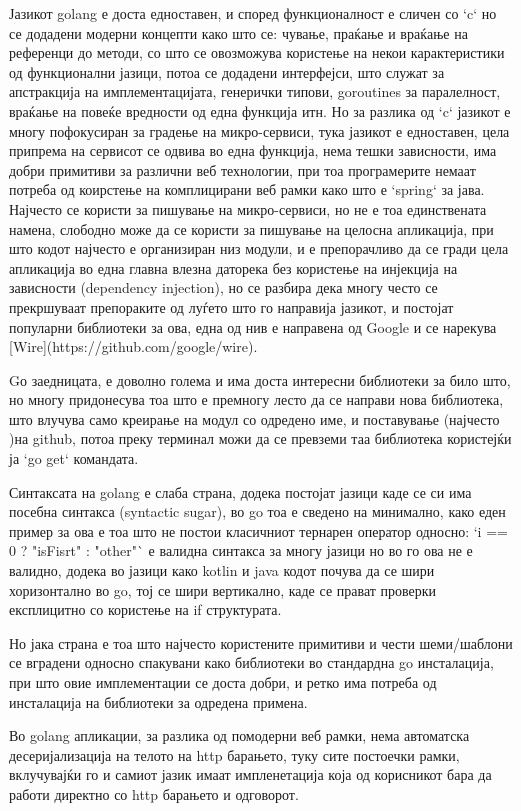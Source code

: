 \documentclass{article}
\begin{document}
Јазикот golang е доста едноставен, и според функционалност е сличен со `c` но се додадени модерни концепти како што се: чување, праќање и враќање на референци до методи, со што се овозможува користење на некои карактеристики од функционални јазици, потоа се додадени интерфејси, што служат за апстракција на имплементацијата, генерички типови, goroutines за паралелност, враќање на повеќе вредности од една функција итн. Но за разлика од `c`  јазикот е многу пофокусиран за градење на микро-сервиси, тука јазикот е едноставен, цела припрема на сервисот се одвива во една функција, нема тешки зависности, има добри примитиви за различни веб технологии, при тоа програмерите немаат потреба од коирстење на комплицирани веб рамки како што е `spring` за јава. Најчесто се користи за пишување на микро-сервиси, но не е тоа единствената намена, слободно може да се користи за пишување на целосна апликација, при што кодот најчесто е организиран низ модули, и е препорачливо да се гради цела апликација во една главна влезна даторека без користење на инјекција на зависности (dependency injection), но се разбира дека многу често се прекршуваат препораките од луѓето што го направија јазикот, и постојат популарни библиотеки за ова, една од нив е направена од Google и се нарекува [Wire](https://github.com/google/wire).

Gо заедницата, е доволно голема и има доста интересни библиотеки за било што, но многу придонесува тоа што е премногу лесто да се направи нова библиотека, што влучува само креирање на модул со одредено име, и поставување  (најчесто )на github, потоа преку терминал можи да се превземи таа библиотека користејќи ја `go get` командата.

Синтаксата на golang е слаба страна, додека постојат јазици каде се си има посебна синтакса (syntactic sugar), во go тоа е сведено на минимално, како еден пример за ова е тоа што не постои класичниот тернарен оператор односно:  `i == 0 ? "isFisrt" : "other"` е валидна синтакса за многу јазици но во го ова не е валидно, додека во јазици како kotlin и java кодот почува да се шири хоризонтално во go, тој се шири вертикално, каде се прават проверки експлицитно со користење на if структурата.

Но јака страна е тоа што најчесто користените примитиви и чести шеми/шаблони се вградени односно спакувани како библиотеки во стандардна go инсталација, при што овие имплементации се доста добри, и ретко има потреба од инсталација на библиотеки за одредена примена.

Во golang апликации, за разлика од помодерни веб рамки, нема автоматска десеријализација на телото на http барањето, туку сите постоечки рамки, вклучувајќи го и самиот јазик имаат импленетација која од корисникот бара да работи директно со http барањето и одговорот.
\end{document}
